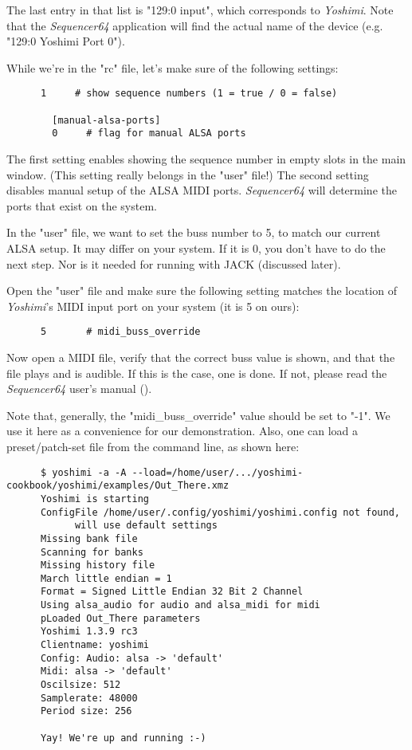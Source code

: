    The last entry in that list is "129:0 input", which corresponds to
   \textsl{Yoshimi}.  Note that the \textsl{Sequencer64} application will
   find the actual name of the device (e.g. "129:0 Yoshimi Port 0").
   
   While we're in the "rc" file, let's make sure of the following settings:

   \begin{verbatim}
      1     # show sequence numbers (1 = true / 0 = false)

		[manual-alsa-ports]
		0     # flag for manual ALSA ports
   \end{verbatim}

   The first setting enables showing the sequence number in empty slots in the
   main window.  (This setting really belongs in the "user" file!)
   The second setting disables manual setup of the ALSA MIDI ports.
   \textsl{Sequencer64} will determine the ports that exist on the system.

   In the "user" file, we want to set the buss number to 5, to match our
   current ALSA setup.  It may differ on your system.  If it is 0, you don't
   have to do the next step.  Nor is it needed for running with JACK (discussed
   later).

   Open the "user" file and make sure the following setting matches the
   location of \textsl{Yoshimi}'s MIDI input port on your system (it is 5 on
   ours):

   \begin{verbatim}
      5       # midi_buss_override
   \end{verbatim}

   Now open a MIDI file, verify that the correct buss value is shown, and that
   the file plays and is audible.  If this is the case, one is done.  If not,
   please read the \textsl{Sequencer64} user's manual
   (\cite{sequencer64doc}).

   Note that, generally, the "midi\_buss\_override" value should be set to
   "-1".  We use it here as a convenience for our demonstration.
   Also, one can load a preset/patch-set file from the command line, as shown
   here:

   \begin{verbatim}
      $ yoshimi -a -A --load=/home/user/.../yoshimi-cookbook/yoshimi/examples/Out_There.xmz
      Yoshimi is starting
      ConfigFile /home/user/.config/yoshimi/yoshimi.config not found,
            will use default settings
      Missing bank file
      Scanning for banks
      Missing history file
      March little endian = 1
      Format = Signed Little Endian 32 Bit 2 Channel
      Using alsa_audio for audio and alsa_midi for midi
      pLoaded Out_There parameters
      Yoshimi 1.3.9 rc3
      Clientname: yoshimi
      Config: Audio: alsa -> 'default'
      Midi: alsa -> 'default'
      Oscilsize: 512
      Samplerate: 48000
      Period size: 256

      Yay! We're up and running :-)
   \end{verbatim}

